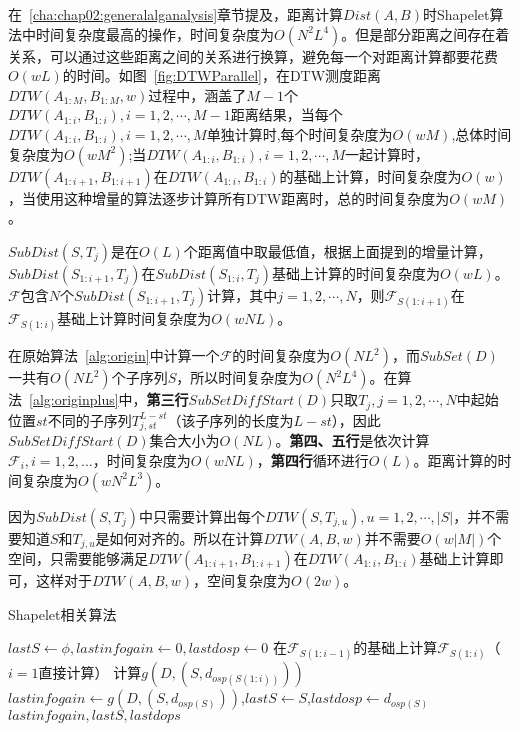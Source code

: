 {\color{red}{在这里要注明每个线程要完成的事情,每个线程的空间复杂度,时间复杂度,均摊,复杂度这块也许可以放在算法设计阶段}}

在~\ref{cha:chap02:generalalganalysis}章节提及，距离计算$Dist(A,B)$时Shapelet算法中时间复杂度最高的操作，时间复杂度为$O(N^2L^4)$。但是部分距离之间存在着关系，可以通过这些距离之间的关系进行换算，避免每一个对距离计算都要花费$O(wL)$的时间。如图~\ref{fig:DTWParallel}，在DTW测度距离$DTW(A_{1:M},B_{1:M},w)$过程中，涵盖了$M-1$个$DTW(A_{1:i},B_{1:i}),i=1,2,\cdots,M-1$距离结果，当每个$DTW(A_{1:i},B_{1:i}),i=1,2,\cdots,M$单独计算时,每个时间复杂度为$O(wM)$,总体时间复杂度为$O(wM^2)$;当$DTW(A_{1:i},B_{1:i}),i=1,2,\cdots,M$一起计算时，$DTW(A_{1:i+1},B_{1:i+1})$在$DTW(A_{1:i},B_{1:i})$的基础上计算，时间复杂度为$O(w)$，当使用这种增量的算法逐步计算所有DTW距离时，总的时间复杂度为$O(wM)$。

$SubDist(S,T_j)$是在$O(L)$个距离值中取最低值，根据上面提到的增量计算，$SubDist(S_{1:i+1},T_j)$在$SubDist(S_{1:i},T_j)$基础上计算的时间复杂度为$O(wL)$。$\mathcal{F}$包含$N$个$SubDist(S_{1:i+1},T_j)$计算，其中$j=1,2,\cdots,N$，则$\mathcal{F}_{S(1:i+1)}$在$\mathcal{F}_{S(1:i)}$基础上计算时间复杂度为$O(wNL)$。

在原始算法~\ref{alg:origin}中计算一个$\mathcal{F}$的时间复杂度为$O(NL^2)$，而$SubSet(D)$一共有$O(NL^2)$个子序列$S$，所以时间复杂度为$O(N^2L^4)$。在算法~\ref{alg:originplus}中，\textbf{第三行}$SubSetDiffStart(D)$只取$T_j,j=1,2,\cdots,N$中起始位置$st$不同的子序列$T_{j,st}^{L-st}$（该子序列的长度为$L-st$），因此$SubSetDiffStart(D)$集合大小为$O(NL)$。\textbf{第四、五行}是依次计算$\mathcal{F}_i,i=1,2,...$，时间复杂度为$O(wNL)$，\textbf{第四行}循环进行$O(L)$。距离计算的时间复杂度为$O(wN^2L^3)$。

因为$SubDist(S,T_j)$中只需要计算出每个$DTW(S,T_{j,u}),u=1,2,\cdots,|S|$，并不需要知道$S$和$T_{j,u}$是如何对齐的。所以在计算$DTW(A,B,w)$并不需要$O(w|M|)$个空间，只需要能够满足$DTW(A_{1:i+1},B_{1:i+1})$在$DTW(A_{1:i},B_{1:i})$基础上计算即可，这样对于$DTW(A,B,w)$，空间复杂度为$O(2w)$。

{}


\begin{algorithm}
	\caption{Shapelet相关算法}
	\label{alg:originplus}
	\begin{algorithmic}[1]
			\State $lastS \gets \phi, lastinfogain \gets 0, lastdosp \gets 0$
					\State 在$\mathcal{F}_{S(1:i-1)}$的基础上计算$\mathcal{F}_{S(1:i)}$（$i=1$直接计算）
					\State 计算$g(D,(S,d_{osp(S(1:i))}))$
						\State $lastinfogain \gets g(D,(S,d_{osp(S)}))$,$lastS\gets S$,$lastdosp\gets d_{osp(S)}$
					\EndIf
				\EndFor
			\EndFor
			\State \Return $lastinfogain,lastS,lastdops$
		\EndFunction
	\end{algorithmic}
\end{algorithm}

